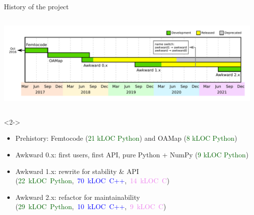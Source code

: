 \documentclass[aspectratio=169]{beamer}
\begin{document}
\begin{frame}{History of the project}

\begin{columns}
\includegraphics[width=\linewidth]{awkward-timeline.pdf}
\end{columns}

\begin{uncoverenv}<2->
\begin{itemize}
\item Prehistory: Femtocode {\small (\textcolor{darkgreen}{21 kLOC Python})} and OAMap {\small (\textcolor{darkgreen}{8 kLOC Python})}
\item Awkward 0.x: first users, first API, pure Python + NumPy {\small (\textcolor{darkgreen}{9 kLOC Python})}
\item Awkward 1.x: rewrite for stability \& API \mbox{\small (\textcolor{darkgreen}{22 kLOC Python}, \textcolor{blue}{70 kLOC C++}, \textcolor{violet}{14 kLOC C})\hspace{-0.5 cm}}
\item Awkward 2.x: refactor for maintainability \mbox{\small (\textcolor{darkgreen}{29 kLOC Python}, \textcolor{blue}{10 kLOC C++}, \textcolor{violet}{9 kLOC C})\hspace{-0.5 cm}}
\end{itemize}
\end{uncoverenv}
\end{frame}
\end{document}
